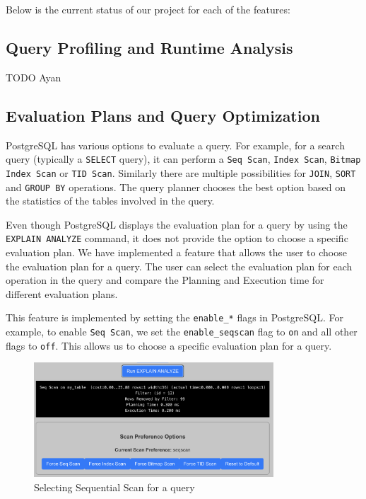 \documentclass{article}
\begin{document}
Below is the current status of our project for each of the features:

\subsection{Query Profiling and Runtime Analysis}

TODO Ayan

\subsection{Evaluation Plans and Query Optimization}

PostgreSQL has various options to evaluate a query. For example, for a search query (typically a \verb|SELECT| query), it can perform a \verb|Seq Scan|, \verb|Index Scan|, \verb|Bitmap Index Scan| or \verb|TID Scan|. Similarly there are multiple possibilities for \verb|JOIN|, \verb|SORT| and \verb|GROUP BY| operations. The query planner chooses the best option based on the statistics of the tables involved in the query.

\medskip

Even though PostgreSQL displays the evaluation plan for a query by using the \verb|EXPLAIN ANALYZE| command, it does not provide the option to choose a specific evaluation plan. We have implemented a feature that allows the user to choose the evaluation plan for a query. The user can select the evaluation plan for each operation in the query and compare the Planning and Execution time for different evaluation plans.

\medskip

This feature is implemented by setting the \verb|enable_*| flags in PostgreSQL. For example, to enable \verb|Seq Scan|, we set the \verb|enable_seqscan| flag to \verb|on| and all other flags to \verb|off|. This allows us to choose a specific evaluation plan for a query.

\begin{figure}[htbp]
    \centering
    \includegraphics[width=0.8\textwidth]{seq.png}
    \caption{Selecting Sequential Scan for a query}
\end{figure}
\end{document}
